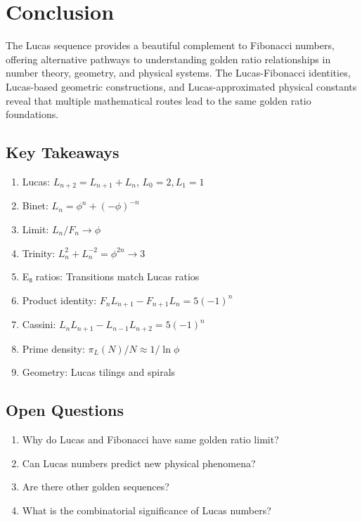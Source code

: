 \section{Conclusion}

The Lucas sequence provides a beautiful complement to Fibonacci numbers, offering alternative pathways to understanding golden ratio relationships in number theory, geometry, and physical systems. The Lucas-Fibonacci identities, Lucas-based geometric constructions, and Lucas-approximated physical constants reveal that multiple mathematical routes lead to the same golden ratio foundations.

\subsection*{Key Takeaways}

\begin{enumerate}
    \item Lucas: $L_{n+2} = L_{n+1} + L_n$, $L_0 = 2, L_1 = 1$
    \item Binet: $L_n = \phi^n + (-\phi)^{-n}$
    \item Limit: $L_n/F_n \to \phi$
    \item Trinity: $L_n^2 + L_n^{-2} = \phi^{2n} \to 3$
    \item E₈ ratios: Transitions match Lucas ratios
    \item Product identity: $F_n L_{n+1} - F_{n+1} L_n = 5(-1)^n$
    \item Cassini: $L_n L_{n+1} - L_{n-1} L_{n+2} = 5(-1)^n$
    \item Prime density: $\pi_L(N)/N \approx 1/\ln\phi$
    \item Geometry: Lucas tilings and spirals
\end{enumerate}

\subsection*{Open Questions}

\begin{enumerate}
    \item Why do Lucas and Fibonacci have same golden ratio limit?
    \item Can Lucas numbers predict new physical phenomena?
    \item Are there other golden sequences?
    \item What is the combinatorial significance of Lucas numbers?
\end{enumerate}

